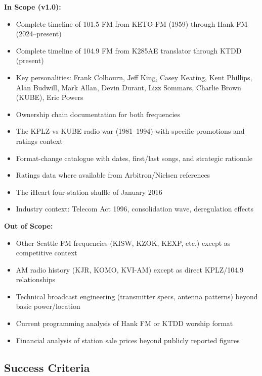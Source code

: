 \documentclass[11pt,letterpaper]{article}
\begin{document}
\textbf{In Scope (v1.0):}
\begin{itemize}[leftmargin=2em]
\item Complete timeline of 101.5 FM from KETO-FM (1959) through Hank FM (2024--present)
\item Complete timeline of 104.9 FM from K285AE translator through KTDD (present)
\item Key personalities: Frank Colbourn, Jeff King, Casey Keating, Kent Phillips, Alan Budwill, Mark Allan, Devin Durant, Lizz Sommars, Charlie Brown (KUBE), Eric Powers
\item Ownership chain documentation for both frequencies
\item The KPLZ-vs-KUBE radio war (1981--1994) with specific promotions and ratings context
\item Format-change catalogue with dates, first/last songs, and strategic rationale
\item Ratings data where available from Arbitron/Nielsen references
\item The iHeart four-station shuffle of January 2016
\item Industry context: Telecom Act 1996, consolidation wave, deregulation effects
\end{itemize}

\textbf{Out of Scope:}
\begin{itemize}[leftmargin=2em]
\item Other Seattle FM frequencies (KISW, KZOK, KEXP, etc.) except as competitive context
\item AM radio history (KJR, KOMO, KVI-AM) except as direct KPLZ/104.9 relationships
\item Technical broadcast engineering (transmitter specs, antenna patterns) beyond basic power/location
\item Current programming analysis of Hank FM or KTDD worship format
\item Financial analysis of station sale prices beyond publicly reported figures
\end{itemize}

\subsection{Success Criteria}
\end{document}
